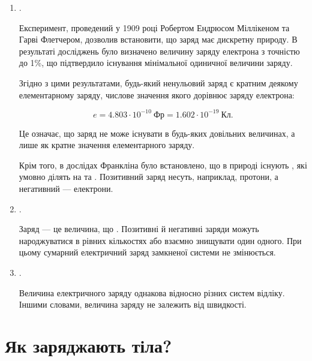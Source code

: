 \begin{enumerate}
	\item {}.

    Експеримент, проведений у 1909 році Робертом Ендрюсом Міллікеном та Гарві Флетчером, дозволив встановити, що заряд має дискретну природу. В
    результаті досліджень було визначено величину заряду електрона з точністю до 1\%, що підтвердило існування мінімальної одиничної величини заряду.

    Згідно з цими результатами, будь-який ненульовий заряд є кратним деякому елементарному заряду, числове значення якого дорівнює заряду електрона:

    \begin{equation*} e = 4.803 \cdot 10^{-10}\ \text{Фр} = 1.602 \cdot 10^{-19}\ \text{Кл}. \end{equation*}

    Це означає, що заряд не може існувати в будь-яких довільних величинах, а лише як кратне значення елементарного заряду.

        Крім того, в дослідах Франкліна було встановлено, що в природі існують , які умовно ділять на  та
	      . Позитивний заряд несуть, наприклад, протони, а негативний --- електрони.


	\item {}.

	      Заряд --- це величина, що . Позитивні й негативні заряди можуть народжуватися в рівних кількостях або взаємно
	      знищувати один одного. При цьому сумарний електричний заряд замкненої системи не змінюється.
	\item {}.

	      Величина електричного заряду однакова відносно різних систем відліку. Іншими словами, величина заряду не залежить від швидкості.
\end{enumerate}


\section{Як заряджають тіла?}


